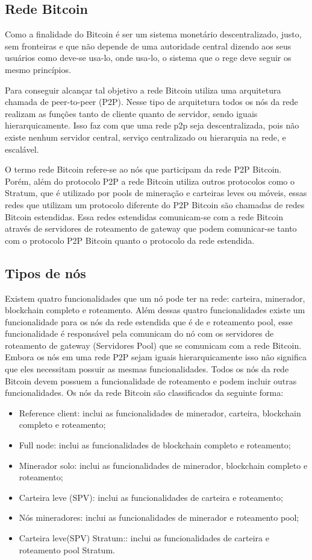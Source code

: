 \documentclass[conference,compsoc]{IEEEtran}
\begin{document}
\subsection{Rede Bitcoin}
Como a finalidade do Bitcoin é ser um sistema monetário descentralizado, justo, sem fronteiras e que não depende de uma autoridade central dizendo aos seus usuários como deve-se usa-lo, onde usa-lo, o sistema que o rege deve seguir os mesmo princípios.

Para conseguir alcançar tal objetivo a rede Bitcoin utiliza uma arquitetura chamada de peer-to-peer (P2P). Nesse tipo de arquitetura todos os nós da rede realizam as funções tanto de cliente quanto de servidor, sendo iguais hierarquicamente. Isso faz com que uma rede p2p seja descentralizada, pois não existe nenhum servidor central, serviço centralizado ou hierarquia na rede, e escalável.

O termo rede Bitcoin refere-se ao nós que participam da rede P2P Bitcoin. Porém, além do protocolo P2P a rede Bitcoin utiliza outros protocolos como o Stratum, que é utilizado por pools de mineração e carteiras leves ou móveis, essas redes que utilizam um protocolo diferente do P2P Bitcoin são chamadas de redes Bitcoin estendidas. Essa redes estendidas comunicam-se com a rede Bitcoin através de servidores de roteamento de gateway que podem comunicar-se tanto com o protocolo P2P Bitcoin quanto o protocolo da rede estendida.

\subsection*{Tipos de nós}
Existem quatro funcionalidades que um nó pode ter na rede: carteira, minerador, blockchain completo e roteamento. Além dessas quatro funcionalidades existe um funcionalidade para os nós da rede estendida que é de e roteamento pool, esse funcionalidade é responsável pela comunicam do nó com os servidores de roteamento de gateway (Servidores Pool) que se comunicam com a rede Bitcoin. Embora os nós em uma rede P2P sejam iguais hierarquicamente isso não significa que eles necessitam possuir as mesmas funcionalidades. Todos os nós da rede Bitcoin devem possuem a funcionalidade de roteamento e podem incluir outras funcionalidades. Os nós da rede Bitcoin são classificados da seguinte forma:

\begin{itemize}
\item Reference client: inclui as funcionalidades de minerador, carteira, blockchain completo e roteamento;
\item Full node: inclui as funcionalidades de blockchain completo e roteamento;
\item Minerador solo: inclui as funcionalidades de minerador, blockchain completo  e roteamento;
\item Carteira leve (SPV): inclui as funcionalidades de carteira e roteamento;
\item Nós mineradores: inclui as funcionalidades de minerador e  roteamento pool;
\item Carteira leve(SPV) Stratum:: inclui as funcionalidades de carteira e roteamento pool Stratum.
\end{itemize}
\end{document}
